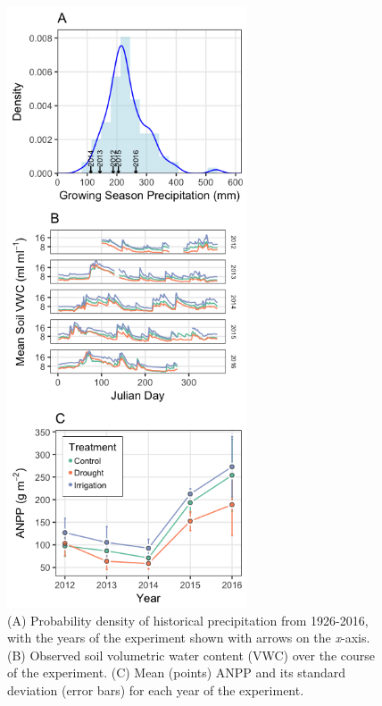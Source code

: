 \documentclass[fleqn,10pt,lineno]{wlpeerj} %
\begin{document}
\begin{figure}[!ht]
  \centering
      \includegraphics[height=7in]{../figures/Figure1.png}
  \caption{(A) Probability density of historical precipitation from 1926-2016, with the years of the experiment shown with arrows on the \emph{x}-axis. (B) Observed soil volumetric water content (VWC) over the course of the experiment. (C) Mean (points) ANPP and its standard deviation (error bars) for each year of the experiment.}
\end{figure}

\newpage{}
\end{document}
